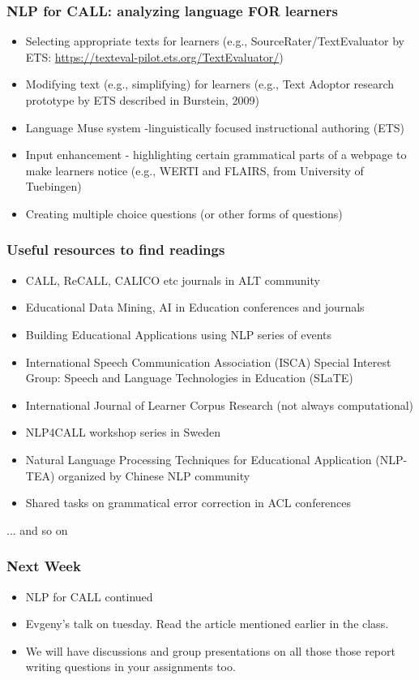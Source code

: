 \documentclass{beamer}
\begin{document}
\begin{frame}
\frametitle{NLP for CALL: analyzing language FOR learners}
\begin{itemize}
\item Selecting appropriate texts for learners (e.g., SourceRater/TextEvaluator by ETS: \url{https://texteval-pilot.ets.org/TextEvaluator/})
\item Modifying text (e.g., simplifying) for learners (e.g., Text Adoptor research prototype by ETS described in Burstein, 2009)
\item Language Muse system -linguistically focused instructional authoring (ETS)
\item Input enhancement - highlighting certain grammatical parts of a webpage to make learners notice (e.g., WERTI and FLAIRS, from University of Tuebingen)
\item Creating multiple choice questions (or other forms of questions)
\end{itemize}
\end{frame}

\begin{frame}
\frametitle{Useful resources to find readings}
\begin{itemize}
\item CALL, ReCALL, CALICO etc journals in ALT community
\item Educational Data Mining, AI in Education conferences and journals
\item Building Educational Applications using NLP series of events
\item International Speech Communication Association (ISCA) Special Interest Group: Speech and Language Technologies in Education (SLaTE) 
\item International Journal of Learner Corpus Research (not always computational)
\item NLP4CALL workshop series in Sweden
\item Natural Language Processing Techniques for Educational Application (NLP-TEA) organized by Chinese NLP community
\item Shared tasks on grammatical error correction in ACL conferences
\end{itemize}
... and so on
\end{frame}

\begin{frame}
\frametitle{Next Week}
\begin{itemize}
\item NLP for CALL continued
\item Evgeny's talk on tuesday. Read the article mentioned earlier in the class.
\item We will have discussions and group presentations on all those those report writing questions in your assignments too.
\end{itemize}
\end{frame}
\end{document}
